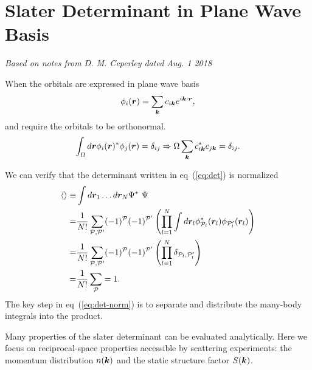 \section{Slater Determinant in Plane Wave Basis}
\label{sec:wf-pw-sdet}
\textit{Based on notes from D. M. Ceperley dated Aug. 1 2018}

When the orbitals are expressed in plane wave basis
\begin{align}
\phi_i(\boldsymbol{r}) = \sum\limits_{\boldsymbol{k}} c_{i\boldsymbol{k}} e^{i\boldsymbol{k}\cdot\boldsymbol{r}}, \label{eq:pw-orb}
\end{align}
and require the orbitals to be orthonormal.
\begin{align}
\int_\Omega d\boldsymbol{r} \phi_i(\boldsymbol{r})^*\phi_j(\boldsymbol{r}) = \delta_{ij} \Rightarrow 
\Omega \sum\limits_{\boldsymbol{k}} c_{i\boldsymbol{k}}^*c_{j\boldsymbol{k}} = \delta_{ij}. \label{eq:on_orbs}
\end{align}

We can verify that the determinant written in eq~(\ref{eq:det}) is normalized
\begin{align}
\braket{} \equiv& \int d\boldsymbol{r}_1\dots d\boldsymbol{r}_N \Psi^*~ \Psi \nonumber \\
=& \frac{1}{N!} \sum\limits_{\mathcal{P},\mathcal{P'}} (-1)^{\mathcal{P}} (-1)^{\mathcal{P'}}
\left(
\prod\limits_{l=1}^{N} \int d\boldsymbol{r}_l \phi^*_{\mathcal{P}_l}(\boldsymbol{r}_l)\phi_{\mathcal{P}_l'}(\boldsymbol{r}_l)
\right)\nonumber \\
=& \frac{1}{N!} \sum\limits_{\mathcal{P},\mathcal{P'}} (-1)^{\mathcal{P}} (-1)^{\mathcal{P'}}
\left(
\prod\limits_{l=1}^{N} \delta_{\mathcal{P}_l,\mathcal{P}_l'}
\right) \nonumber \\
=& \frac{1}{N!} \sum\limits_{\mathcal{P}} = 1. \label{eq:det-norm}
\end{align}
The key step in eq~(\ref{eq:det-norm}) is to separate and distribute the many-body integrals into the product.


Many properties of the slater determinant can be evaluated analytically. Here we focus on reciprocal-space properties accessible by scattering experiments: the momentum distribution $n(\boldsymbol{k})$ and the static structure factor $S(\boldsymbol{k})$. %

